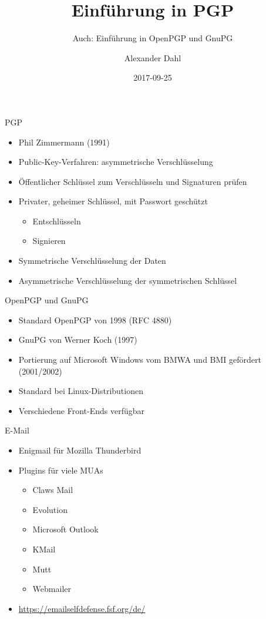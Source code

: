 \documentclass{beamer}
\title[PGP]{Einführung in PGP}
\subtitle{Auch: Einführung in OpenPGP und GnuPG}
\author{Alexander Dahl}
\institute[lespocky.de]{\url{http://www.lespocky.de/}}
\date{2017-09-25}
\begin{document}
\begin{frame}
	\titlepage
\end{frame}

\begin{frame}{PGP}
    \begin{itemize}
        \item Phil Zimmermann (1991)
        \item Public-Key-Verfahren: asymmetrische Verschlüsselung
        \item Öffentlicher Schlüssel zum Verschlüsseln und Signaturen prüfen
        \item Privater, geheimer Schlüssel, mit Passwort geschützt
            \begin{itemize}
                \item Entschlüsseln
                \item Signieren
            \end{itemize}
        \item Symmetrische Verschlüsselung der Daten
        \item Asymmetrische Verschlüsselung der symmetrischen Schlüssel
    \end{itemize}
\end{frame}

\begin{frame}{OpenPGP und GnuPG}
    \begin{itemize}
        \item Standard OpenPGP von 1998 (RFC 4880)
        \item GnuPG von Werner Koch (1997)
        \item Portierung auf Microsoft Windows vom BMWA und BMI gefördert (2001/2002)
        \item Standard bei Linux-Distributionen
        \item Verschiedene Front-Ends verfügbar
    \end{itemize}
\end{frame}

\begin{frame}{E-Mail}
    \begin{itemize}
        \item Enigmail für Mozilla Thunderbird
        \item Plugins für viele MUAs
            \begin{itemize}
                \item Claws Mail
                \item Evolution
                \item Microsoft Outlook
                \item KMail
                \item Mutt
                \item Webmailer
            \end{itemize}
        \item \url{https://emailselfdefense.fsf.org/de/}
    \end{itemize}
\end{frame}
\end{document}
